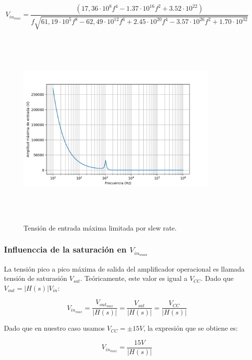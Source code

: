 \begin{equation}
	V_{in_{max}}  = \frac{\left(17,36 \cdot 10^8 f^{4} - 1.37 \cdot 10^{16} f^{2} + 3.52 \cdot 10^{22}\right)}{f \sqrt{61,19 \cdot 10^5 f^{8} - 62,49 \cdot 10^{12} f^{6} + 2.45 \cdot 10^{20} f^{4} - 3.57 \cdot 10^{26} f^{2} + 1.70 \cdot 10^{32}}}		
\label{vin_max}
\end{equation}


\begin{figure}[H] %
	\centering
	\includegraphics[width=10cm,height=10cm,keepaspectratio]{../EJ1/00GRAFICOS/vinmaxsr.png}
	\caption{Tensi\'on de entrada m\'axima limitada por slew rate.}
	\label{vinmaxsr}
\end{figure}

\subsubsection*{Influenccia de la saturaci\'on en $V_{in_{max}}$}
La tensi\'on pico a pico m\'axima de salida del amplificador operacional es llamada 
tensi\'on de saturasi\'on $V_{sat}$. Te\'oricamente, este valor es igual a $V_{CC}$. Dado que $V_{out} = \rvert H(s) \rvert V_{in}$:

\begin{equation}
V_{in_{max}} = \frac{V_{out_{max}}}{\rvert H(s) \rvert} = \frac{V_{sat}}{\rvert H(s) \rvert} = \frac{V_{CC}}{\rvert H(s) \rvert}
\end{equation}

Dado que en nuestro caso usamos $V_{CC} = \pm15V$, la expresi\'on que se obtiene es:

\begin{equation}
V_{in_{max}} = \frac{15V}{\rvert H(s) \rvert} 
\end{equation}



